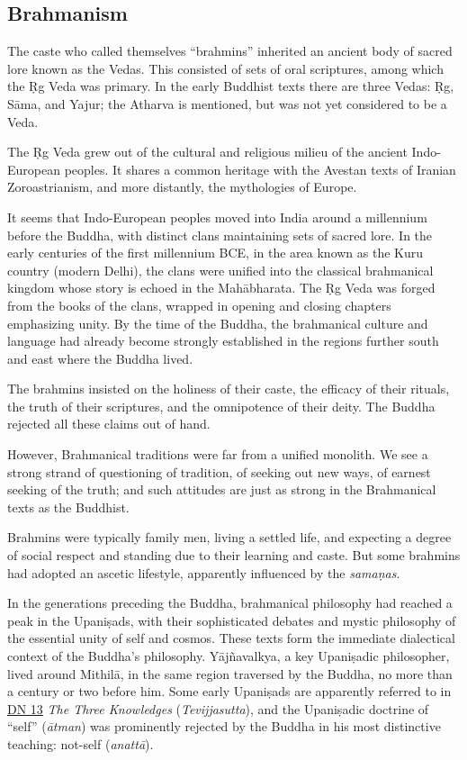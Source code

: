 \documentclass[12pt,openany]{book}%
\begin{document}
\subsection*{Brahmanism}

The caste who called themselves “brahmins” inherited an ancient body of sacred lore known as the Vedas. This consisted of sets of oral scriptures, among which the Ṛg Veda was primary. In the early Buddhist texts there are three Vedas: Ṛg, \textsanskrit{Sāma}, and Yajur; the Atharva is mentioned, but was not yet considered to be a Veda.

The Ṛg Veda grew out of the cultural and religious milieu of the ancient Indo-European peoples. It shares a common heritage with the Avestan texts of Iranian Zoroastrianism, and more distantly, the mythologies of Europe.

It seems that Indo-European peoples moved into India around a millennium before the Buddha, with distinct clans maintaining sets of sacred lore. In the early centuries of the first millennium BCE, in the area known as the Kuru country (modern Delhi), the clans were unified into the classical brahmanical kingdom whose story is echoed in the \textsanskrit{Mahābharata}. The Ṛg Veda was forged from the books of the clans, wrapped in opening and closing chapters emphasizing unity. By the time of the Buddha, the brahmanical culture and language had already become strongly established in the regions further south and east where the Buddha lived.

The brahmins insisted on the holiness of their caste, the efficacy of their rituals, the truth of their scriptures, and the omnipotence of their deity. The Buddha rejected all these claims out of hand.

However, Brahmanical traditions were far from a unified monolith. We see a strong strand of questioning of tradition, of seeking out new ways, of earnest seeking of the truth; and such attitudes are just as strong in the Brahmanical texts as the Buddhist.

Brahmins were typically family men, living a settled life, and expecting a degree of social respect and standing due to their learning and caste. But some brahmins had adopted an ascetic lifestyle, apparently influenced by the \textit{\textsanskrit{samaṇas}}.

In the generations preceding the Buddha, brahmanical philosophy had reached a peak in the \textsanskrit{Upaniṣads}, with their sophisticated debates and mystic philosophy of the essential unity of self and cosmos. These texts form the immediate dialectical context of the Buddha’s philosophy. \textsanskrit{Yājñavalkya}, a key \textsanskrit{Upaniṣadic} philosopher, lived around \textsanskrit{Mithilā}, in the same region traversed by the Buddha, no more than a century or two before him. Some early \textsanskrit{Upaniṣads} are apparently referred to in \href{https://suttacentral.net/dn13}{DN 13} \textit{The Three Knowledges} (\textit{Tevijjasutta}), and the \textsanskrit{Upaniṣadic} doctrine of “self” (\textit{\textsanskrit{ātman}}) was prominently rejected by the Buddha in his most distinctive teaching: not-self (\textit{\textsanskrit{anattā}}).
\end{document}
